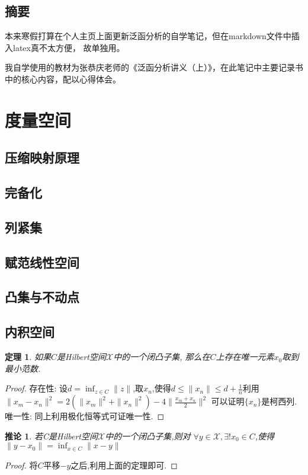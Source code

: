 \documentclass[12pt,a4paper]{article}
\newtheorem{thm}{定理}[subsection]  %
\newtheorem{corollary}{推论}[subsection] %
\begin{document}
\begin{center}
\section*{摘要}
\end{center}

本来寒假打算在个人主页上面更新泛函分析的自学笔记，但在markdown文件中插入latex真不太方便，
故单独用。

我自学使用的教材为张恭庆老师的《泛函分析讲义（上）》，在此笔记中主要记录书中的核心内容，配以心得体会。


{\centering\tableofcontents}

\newpage
\section{度量空间}
\subsection{压缩映射原理}
\subsection{完备化}
\subsection{列紧集}
\subsection{赋范线性空间}
\subsection{凸集与不动点}
\subsection{内积空间}

\begin{thm}
    如果$C$是\rm{Hilbert}空间$\mathscr{X}$中的一个闭凸子集,
    那么在$C$上存在唯一元素$x_0$取到最小范数.
\end{thm}
\begin{proof}
    存在性: 设$d= \inf_{z \in C}\|z\|$,取$x_n$,使得$d\leq \|x_n\|\leq d + \frac{1}{n}$利用\\
    $\|x_m - x_n\|^2 = 2(\|x_m\|^2+\|x_n\|^2)-4\|\frac{x_m + x_n}{2}\|^2$
    可以证明$\{x_n\}$是柯西列.\\
    唯一性: 同上利用极化恒等式可证唯一性.
\end{proof}
\begin{corollary}
    若C是\rm{Hilbert}空间$\mathscr{X}$中的一个闭凸子集,则对
    $\forall y \in \mathscr{X},\exists !x_0 \in C$,使得\\$\|y-x_0\| = \inf_{x\in C}\|x-y\|$
\end{corollary}
\begin{proof}
    将$C$平移$-y$之后,利用上面的定理即可.
\end{proof}
\end{document}
